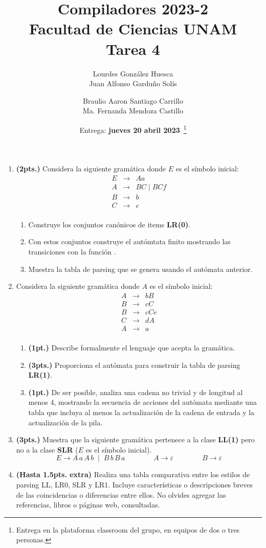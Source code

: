 \documentclass[11pt,letterpaper]{article}
\title{Compiladores 2023-2\\ Facultad de Ciencias UNAM \\ Tarea 4}
\author{Lourdes Gonz\'alez Huesca\\ Juan Alfonso Gardu\~no Sol\'is \and  
Braulio Aaron Santiago Carrillo  \\Ma. Fernanda Mendoza Castillo}
\date{Entrega: \textbf{jueves 20 abril 2023}~\footnote{Entrega en la 
plataforma classroom del grupo, en equipos de dos o tres personas.}}
\begin{document}
\maketitle

\begin{enumerate}
\item \textbf{(2pts.)} Considera la siguiente gram\'atica donde $E$ es el s\'imbolo
inicial:
\[
\begin{array}{rcl}
E & \to & Aa\\
A & \to & BC \mid BCf\\
B & \to & b\\
C & \to & c\\
\end{array}
\]
\begin{enumerate}
\item Construye los conjuntos can\'onicos de items \textbf{LR(0)}.
\item Con estos conjuntos construye el aut\'omtata finito mostrando las transiciones
con la funci\'on {\fgoto}.
\item Muestra la tabla de parsing que se genera usando el aut\'omata anterior. 
\end{enumerate}

\item Considera la siguiente gram\'atica donde $A$ es el s\'imbolo inicial:
\[
\begin{array}{rcl}
A & \to & bB \\
B & \to & cC \\
B & \to & cCe \\
C & \to & dA\\
A & \to & a\\
\end{array}
\]
\begin{enumerate}
\item \textbf{(1pt.)} Describe formalmente el lenguaje que acepta la gram\'atica.
\item \textbf{(3pts.)} Proporciona el aut\'omata para construir la tabla de 
parsing \textbf{LR(1)}.
\item \textbf{(1pt.)} De ser posible, analiza una cadena no trivial y de longitud 
al menos 4, mostrando la secuencia de acciones del aut\'omata mediante una tabla 
que incluya al menos la actualizaci\'on de la cadena de entrada y la actualizaci\'on
de la pila.
\end{enumerate}


\item \textbf{(3pts.)} Muestra que la siguiente gram\'atica pertenece a la 
clase \textbf{LL(1)} pero no a la clase \textbf{SLR} ($E$ es el s\'imbolo inicial).
\[
E \to A \, a\, A\,b \;\mid\; B\,b\,B\,a \qquad \qquad  A \to \varepsilon 
\qquad\qquad B\to \varepsilon
\]

\item \textbf{(Hasta 1.5pts. extra)} Realiza una tabla comparativa entre los estilos de parsing LL, LR0, SLR y LR1. Incluye caracter\'isticas o descripciones breves de las coincidencias o diferencias entre ellos.  
No olvides agregar las referencias, libros o p\'aginas web, consultadas.



\end{enumerate}
\end{document}
